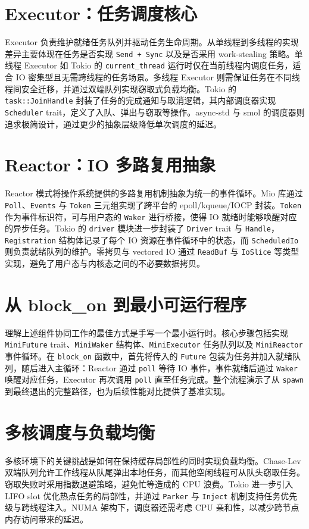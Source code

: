 \chapter{Executor：任务调度核心}
Executor 负责维护就绪任务队列并驱动任务生命周期。从单线程到多线程的实现差异主要体现在任务是否实现 \texttt{Send + Sync} 以及是否采用 work-stealing 策略。单线程 Executor 如 Tokio 的 \texttt{current\_{}thread} 运行时仅在当前线程内调度任务，适合 IO 密集型且无需跨线程的任务场景。多线程 Executor 则需保证任务在不同线程间安全迁移，并通过双端队列实现窃取式负载均衡。Tokio 的 \texttt{task::JoinHandle} 封装了任务的完成通知与取消逻辑，其内部调度器实现 \texttt{Scheduler} trait，定义了入队、弹出与窃取等操作。async-std 与 smol 的调度器则追求极简设计，通过更少的抽象层级降低单次调度的延迟。\par
\chapter{Reactor：IO 多路复用抽象}
Reactor 模式将操作系统提供的多路复用机制抽象为统一的事件循环。Mio 库通过 \texttt{Poll}、\texttt{Events} 与 \texttt{Token} 三元组实现了跨平台的 epoll/kqueue/IOCP 封装。\texttt{Token} 作为事件标识符，可与用户态的 \texttt{Waker} 进行桥接，使得 IO 就绪时能够唤醒对应的异步任务。Tokio 的 \texttt{driver} 模块进一步封装了 \texttt{Driver} trait 与 \texttt{Handle}，\texttt{Registration} 结构体记录了每个 IO 资源在事件循环中的状态，而 \texttt{ScheduledIo} 则负责就绪队列的维护。零拷贝与 vectored IO 通过 \texttt{ReadBuf} 与 \texttt{IoSlice} 等类型实现，避免了用户态与内核态之间的不必要数据拷贝。\par
\chapter{从 block\_{}on 到最小可运行程序}
理解上述组件协同工作的最佳方式是手写一个最小运行时。核心步骤包括实现 \texttt{MiniFuture} trait、\texttt{MiniWaker} 结构体、\texttt{MiniExecutor} 任务队列以及 \texttt{MiniReactor} 事件循环。在 \texttt{block\_{}on} 函数中，首先将传入的 \texttt{Future} 包装为任务并加入就绪队列，随后进入主循环：Reactor 通过 \texttt{poll} 等待 IO 事件，事件就绪后通过 \texttt{Waker} 唤醒对应任务，Executor 再次调用 \texttt{poll} 直至任务完成。整个流程演示了从 \texttt{spawn} 到最终退出的完整路径，也为后续性能对比提供了基准实现。\par
\chapter{多核调度与负载均衡}
多核环境下的关键挑战是如何在保持缓存局部性的同时实现负载均衡。Chase-Lev 双端队列允许工作线程从队尾弹出本地任务，而其他空闲线程可从队头窃取任务。窃取失败时采用指数退避策略，避免忙等造成的 CPU 浪费。Tokio 进一步引入 LIFO slot 优化热点任务的局部性，并通过 \texttt{Parker} 与 \texttt{Inject} 机制支持任务优先级与跨线程注入。NUMA 架构下，调度器还需考虑 CPU 亲和性，以减少跨节点内存访问带来的延迟。\par
